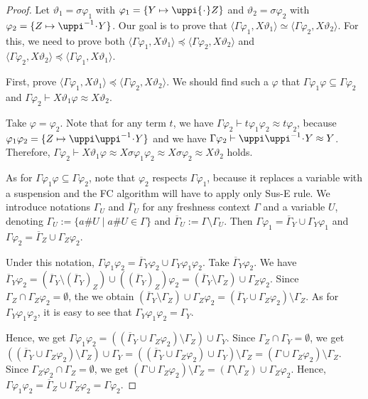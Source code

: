 \documentclass{llncs}
\newcommand{\permap}{{\mkern 1mu\cdot \mkern 1mu}}
\newcommand\ppi{\uppi}
\newcommand{\np}[2]{\langle #1, \allowbreak #2\rangle}
\newcommand{\fe}{{\sf FC}}
\begin{document}
\begin{proof}
Let $\vartheta_1 = \sigma\varphi_1$ with $\varphi_1=\{Y \mapsto \ppi \permap Z\}$ and $\vartheta_2=\sigma\varphi_2$ with $\varphi_2=\{Z \mapsto \ppi^{-1}\permap Y \}$. Our goal is to prove that $\np{\Gamma\varphi_1}{X\vartheta_1} \simeq \np{\Gamma\varphi_2}{X\vartheta_2}$. For this, we need to prove both $\np{\Gamma\varphi_1}{X\vartheta_1} \preceq \np{\Gamma\varphi_2}{X\vartheta_2}$ and $\np{\Gamma\varphi_2}{X\vartheta_2} \preceq \np{\Gamma\varphi_1}{X\vartheta_1}$.

First, prove $\np{\Gamma\varphi_1}{X\vartheta_1} \preceq \np{\Gamma\varphi_2}{X\vartheta_2}$. We should find such a $\varphi$ that $\Gamma\varphi_1\varphi \subseteq \Gamma\varphi_2$ and $\Gamma\varphi_2 \vdash X\vartheta_1\varphi \approx X\vartheta_2$. 

Take $\varphi=\varphi_2$. Note that for any term $t$, we have $\Gamma\varphi_2 \vdash t \varphi_1\varphi_2 \approx t\varphi_2$, because $\varphi_1\varphi_2 =\{Z \mapsto \ppi \ppi^{-1}\permap Y\}$ and we have $\Gamma\varphi_2 \vdash \ppi \ppi^{-1}\permap Y \approx Y$.
 Therefore, $\Gamma\varphi_2 \vdash X\vartheta_1\varphi \approx X\sigma\varphi_1\varphi_2 \approx X\sigma\varphi_2 \approx X\vartheta_2$ holds.


As for $\Gamma\varphi_1\varphi \subseteq \Gamma\varphi_2$, note that $\varphi_2$ respects $\Gamma\varphi_1$, because it replaces a variable with a suspension and the {\fe} algorithm will have to apply only {\sf Sus-E} rule. We introduce notations $\Gamma_U$ and $\overline{\Gamma}_U$ for any freshness context $\Gamma$ and a variable $U$, denoting $ \Gamma_U:= \{a\# U \mid a\# U \in \Gamma\}$ and $\overline{\Gamma}_U := \Gamma \setminus \Gamma_U $. Then $\Gamma\varphi_1= \overline{\Gamma}_Y \cup \Gamma_Y\varphi_1$ and $\Gamma\varphi_2= \overline{\Gamma}_Z \cup \Gamma_Z\varphi_2$.

Under this notation, $\Gamma\varphi_1\varphi_2=\overline{\Gamma}_Y\varphi_2 \cup \Gamma_Y\varphi_1\varphi_2$. Take $\overline{\Gamma}_Y\varphi_2$. We have $\overline{\Gamma}_Y\varphi_2 =
(\overline{\Gamma}_Y \setminus (\overline{\Gamma}_Y)_Z) \cup ((\overline{\Gamma}_Y)_Z)\varphi_2 = (\overline{\Gamma}_Y \setminus \Gamma_Z) \cup \Gamma_Z\varphi_2$. Since $\Gamma_Z\cap \Gamma_Z\varphi_2=\emptyset$, the we obtain $(\overline{\Gamma}_Y \setminus \Gamma_Z) \cup \Gamma_Z\varphi_2=(\overline{\Gamma}_Y \cup \Gamma_Z\varphi_2) \setminus \Gamma_Z$. As for $\Gamma_Y\varphi_1\varphi_2$, it is easy to see that $\Gamma_Y\varphi_1\varphi_2=\Gamma_Y$.

Hence, we get $\Gamma\varphi_1\varphi_2= ((\overline{\Gamma}_Y \cup \Gamma_Z\varphi_2) \setminus \Gamma_Z) \cup \Gamma_Y$. Since $\Gamma_Z\cap \Gamma_Y=\emptyset$, we get
$((\overline{\Gamma}_Y \cup \Gamma_Z\varphi_2) \setminus \Gamma_Z) \cup \Gamma_Y=((\overline{\Gamma}_Y \cup \Gamma_Z\varphi_2) \cup \Gamma_Y) \setminus \Gamma_Z = (\Gamma \cup \Gamma_Z\varphi_2) \setminus \Gamma_Z$. Since $\Gamma_Z\varphi_2\cap \Gamma_Z=\emptyset$, we get $(\Gamma \cup \Gamma_Z\varphi_2) \setminus \Gamma_Z=(\Gamma \setminus \Gamma_Z) \cup \Gamma_Z\varphi_2$. Hence, $\Gamma\varphi_1\varphi_2= \overline{\Gamma}_Z \cup \Gamma_Z\varphi_2 = \Gamma\varphi_2$. 


\end{proof}
\end{document}
